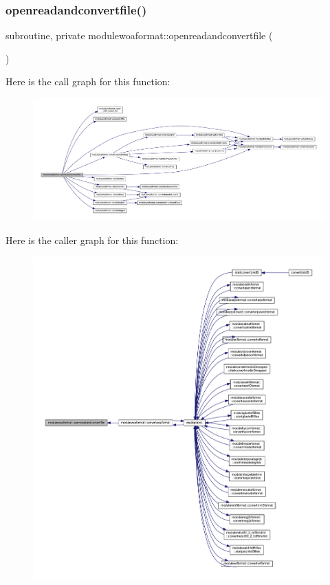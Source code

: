 \subsubsection{\texorpdfstring{openreadandconvertfile()}{openreadandconvertfile()}}
{\footnotesize\ttfamily subroutine, private modulewoaformat\+::openreadandconvertfile (\begin{DoxyParamCaption}{ }\end{DoxyParamCaption})\hspace{0.3cm}{\ttfamily [private]}}

Here is the call graph for this function\+:\nopagebreak
\begin{figure}[H]
\begin{center}
\leavevmode
\includegraphics[width=350pt]{namespacemodulewoaformat_a35891daf8ac8bd662f8f59f673e72cfe_cgraph}
\end{center}
\end{figure}
Here is the caller graph for this function\+:\nopagebreak
\begin{figure}[H]
\begin{center}
\leavevmode
\includegraphics[width=350pt]{namespacemodulewoaformat_a35891daf8ac8bd662f8f59f673e72cfe_icgraph}
\end{center}
\end{figure}
